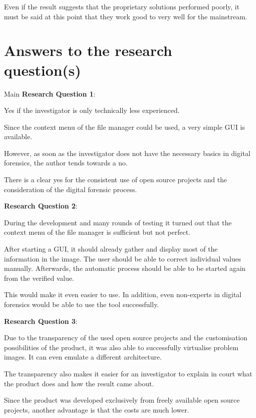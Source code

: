 Even if the result suggests that the proprietary solutions performed poorly, it must be said at this point that they work good to very well for the mainstream.

\section{Answers to the research question(s)}

Main \textbf{Research Question 1}:\newline

\noindent Yes if the investigator is only technically less experienced.

Since the context menu of the file manager could be used, a very simple GUI is available.

However, as soon as the investigator does not have the necessary basics in digital forensics, the author tends towards a no.

There is a clear yes for the consistent use of open source projects and the consideration of the digital forensic process.\newline

\noindent \textbf{Research Question 2}:\newline

\noindent During the development and many rounds of testing it turned out that the context menu of the file manager is sufficient but not perfect.

After starting a GUI, it should already gather and display most of the information in the image. The user should be able to correct individual values manually. Afterwards, the automatic process should be able to be started again from the verified value.

This would make it even easier to use. In addition, even non-experts in digital forensics would be able to use the tool successfully.\newline

\noindent \textbf{Research Question 3}:\newline

\noindent Due to the transparency of the used open source projects and the customisation possibilities of the product, it was also able to successfully virtualise problem images. It can even emulate a different architecture.

The transparency also makes it easier for an investigator to explain in court what the product does and how the result came about.

Since the product was developed exclusively from freely available open source projects, another advantage is that the costs are much lower.